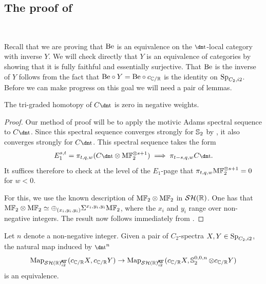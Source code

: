 \subsection{The proof of } \label{subsec:ccr}\ 

Recall that we are proving that $\mathrm{Be}$ is an equivalence on the $\ta$-local category with inverse $Y$.
We will check directly that $Y$ is an equivalence of categories by showing that it is fully faithful and essentially surjective. That $\mathrm{Be}$ is the inverse of $Y$ follows from the fact that $\mathrm{Be} \circ Y = \mathrm{Be} \circ c_{\mathbb{C}/\mathbb{R}}$ is the identity on $\operatorname{\mathrm{Sp}}_{C_2,i2}$. Before we can make progress on this goal we will need a pair of lemmas.

\begin{lem} \label{lem:Cta-neg-w}
  The tri-graded homotopy of $C\ta$ is zero in negative weights.
\end{lem}

\begin{proof}
  Our method of proof will be to apply the motivic Adams spectral sequence to $C\ta$.
  Since this spectral sequence converges strongly for $\operatorname{\mathbb{S}}_2$ by \cite{MAdamsConv}, it also converges strongly for $C\ta$. This spectral sequence takes the form
  $$E_1^{s,t} = \pi_{t,q,w}(C\ta \otimes \HFt^{\otimes {s+1}}) \implies \pi_{t-s,q,w} C\ta.$$
  It suffices therefore to check at the level of the $E_1$-page that $\pi_{t,q,w} \mathrm{M}\mathbb{F}_2^{\otimes {s+1}} = 0$ for $w<0$.
	
  For this, we use the known \cite{Voe03,Voe10,HoyoisSteenrod} description of $\mathrm{M}\mathbb{F}_2 \otimes \mathrm{M}\mathbb{F}_2$ in $\mathcal{SH}(\mathbb{R})$.  One has that $\mathrm{M}\mathbb{F}_2 \otimes \mathrm{M}\mathbb{F}_2 \simeq \oplus_{(x_i,y_i,y_i)} \Sigma^{x_i,y_i,y_i} \mathrm{M}\mathbb{F}_2$, where the $x_i$ and $y_i$ range over non-negative integers.  The result now follows immediately from .
\end{proof}

\begin{lem} \label{prop:weak-one-sided}
  Let $n$ denote a non-negative integer.  Given a pair of $C_2$-spectra $X, Y \in \operatorname{\mathrm{Sp}}_{C_2, i2}$, the natural map induced by $\ta^n$
  \[ \Map_{\SHRat}(c_{\C/\R} X, c_{\C/\R} Y) \to \Map_{\SHRat}(c_{\C/\R} X, \Ss_2^{0,0,n} \otimes c_{\C/\R} Y) \]
  is an equivalence.
\end{lem}

